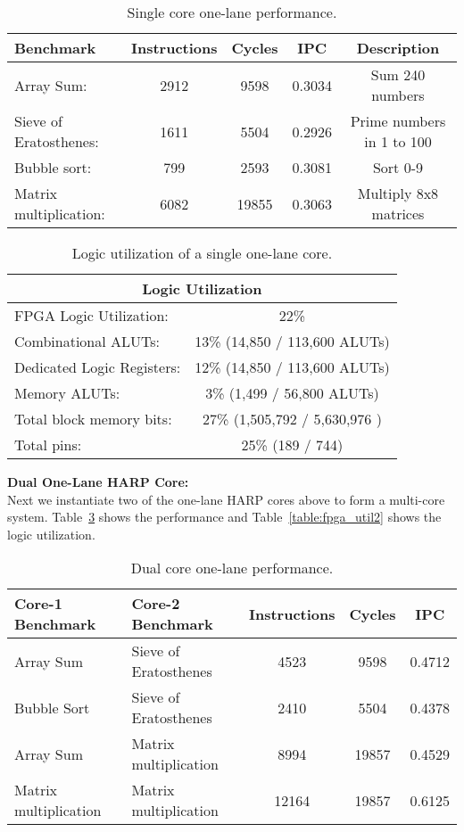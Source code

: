 \begin{table}[!htbp]
  \centering
  \caption{Single core one-lane performance.}
  \begin{tabular}{|l|c|c|c|c|}
    \hline
Benchmark		&Instructions 	&Cycles		&IPC		&Description\\
    \hline
Array Sum:		&2912		&9598		&0.3034 	&Sum 240 numbers \\
Sieve of Eratosthenes:	&1611		&5504		&0.2926 	&Prime numbers in 1 to 100\\
Bubble sort:		&799		&2593		&0.3081 	&Sort 0-9\\
Matrix multiplication:	&6082		&19855		&0.3063 	&Multiply 8x8 matrices\\
    \hline
  \end{tabular}
  \label{table:perf1}
\end{table}

\begin{table}[!htbp]
  \centering
  \caption{Logic utilization of a single one-lane core.}
  \begin{tabular}{|l|c|}
    \hline
    \multicolumn{2}{|c|}{Logic Utilization} \\
    \hline
FPGA Logic Utilization:		& 22\% 	\\
   Combinational ALUTs:		& 13\% 	(14,850 / 113,600 ALUTs)\\
   Dedicated Logic Registers:	& 12\% 	(14,850 / 113,600 ALUTs)\\
   Memory ALUTs:		& 3\% 	(1,499 / 56,800 ALUTs)\\
Total block memory bits:	& 27\%  (1,505,792 / 5,630,976 )\\
Total pins:			& 25\% 	(189 / 744)\\
    \hline
  \end{tabular}
  \label{table:fpga_util1}
\end{table}

\noindent\textbf{Dual One-Lane HARP Core:}\\
Next we instantiate two of the one-lane HARP cores above to form a multi-core system. Table~\ref{table:perf2} shows the performance and Table~\ref{table:fpga_util2} shows the logic utilization.

\begin{table}[!htbp]
  \centering
  \caption{Dual core one-lane performance.}
  \begin{tabular}{|l|l|c|c|c|}
    \hline
Core-1 Benchmark	&Core-2 Benchmark	&Instructions 	&Cycles		&IPC	\\
    \hline
Array Sum   	&Sieve of Eratosthenes 			&4523		&9598		&0.4712	\\
Bubble Sort   	&Sieve of Eratosthenes    			&2410		&5504		&0.4378	\\
Array Sum		&Matrix multiplication		&8994		&19857		&0.4529	\\
Matrix multiplication&Matrix multiplication	&12164		&19857		&0.6125 \\
    \hline
  \end{tabular}
  \label{table:perf2}
\end{table}

